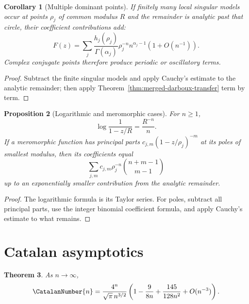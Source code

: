 \documentclass[11pt,a4paper,oneside,openany]{book}
\newtheorem{theorem}{Theorem}[chapter]
\newtheorem{proposition}[theorem]{Proposition}
\newtheorem{corollary}[theorem]{Corollary}
\theoremstyle{definition}
\theoremstyle{remark}
\begin{document}
\begin{corollary}[Multiple dominant points]
If finitely many local singular models occur at points $\rho_j$ of common
modulus $R$ and the remainder is analytic past that circle, their coefficient
contributions add:
\begin{equation}
 [z^n]F(z)=\sum_j\frac{h_j(\rho_j)}{\Gamma(\alpha_j)}
 \rho_j^{-n}n^{\alpha_j-1}(1+O(n^{-1})).                            \label{eq:merged-multiple-transfer}
\end{equation}
Complex conjugate points therefore produce periodic or oscillatory terms.
\end{corollary}

\begin{proof}
Subtract the finite singular models and apply Cauchy's estimate to the analytic
remainder; then apply Theorem~\ref{thm:merged-darboux-transfer} term by term.
\end{proof}

\begin{proposition}[Logarithmic and meromorphic cases]
For $n\geq1$,
\begin{equation}
 [z^n]\log\frac1{1-z/R}=\frac{R^{-n}}n.                             \label{eq:merged-log-transfer}
\end{equation}
If a meromorphic function has principal parts
$c_{j,m}(1-z/\rho_j)^{-m}$ at its poles of smallest modulus, then its
coefficients equal
\begin{equation}
 \sum_{j,m}c_{j,m}\rho_j^{-n}\binom{n+m-1}{m-1}
\end{equation}
up to an exponentially smaller contribution from the analytic remainder.
\end{proposition}

\begin{proof}
The logarithmic formula is its Taylor series.  For poles, subtract all
principal parts, use the integer binomial coefficient formula, and apply
Cauchy's estimate to what remains.
\end{proof}

\section{Catalan asymptotics}

\begin{theorem}
As $n\to\infty$,
\begin{equation}
 \CatalanNumber{n}=\frac{4^n}{\sqrt\pi\,n^{3/2}}
 \left(1-\frac9{8n}+\frac{145}{128n^2}+O(n^{-3})\right).            \label{eq:merged-catalan-asymp}
\end{equation}
\end{theorem}
\end{document}
